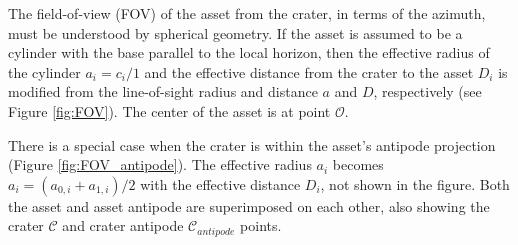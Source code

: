 \documentclass{article}
\begin{document}
The field-of-view (FOV) of the asset from the crater, in terms of the azimuth, must be understood by spherical geometry. If the asset is assumed to be a cylinder with the base parallel to the local horizon, then the effective radius of the cylinder $a_i = c_i/1$ and the effective distance from the crater to the asset $D_i$ is modified from the line-of-sight radius and distance $a$ and $D$, respectively (see Figure \ref{fig:FOV}). The center of the asset is at point $\mathcal{O}$.

There is a special case when the crater is within the asset's antipode projection (Figure \ref{fig:FOV_antipode}). The effective radius $a_i$ becomes $a_i = (a_{0,i} + a_{1,i})/2$ with the effective distance $D_i$, not shown in the figure. Both the asset and asset antipode are superimposed on each other, also showing the crater $\mathcal{C}$ and crater antipode $\mathcal{C}_{antipode}$ points. 
\end{document}
